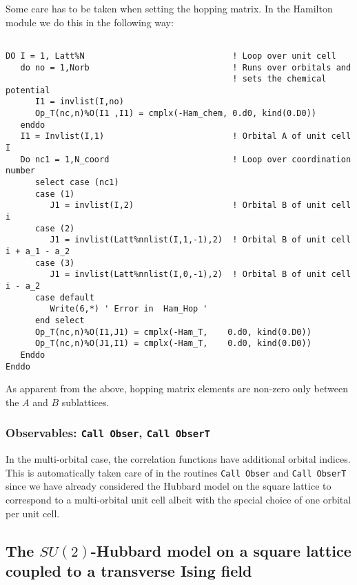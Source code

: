 Some care has to be taken when setting the hopping matrix.    In the Hamilton module    we do this in the following way:

\begin{lstlisting}

DO I = 1, Latt%N                              ! Loop over unit cell 
   do no = 1,Norb                             ! Runs over orbitals and 
                                              ! sets the chemical potential
      I1 = invlist(I,no)  
      Op_T(nc,n)%O(I1 ,I1) = cmplx(-Ham_chem, 0.d0, kind(0.D0))
   enddo
   I1 = Invlist(I,1)                          ! Orbital A of unit cell I
   Do nc1 = 1,N_coord                         ! Loop over coordination  number
      select case (nc1)
      case (1)
         J1 = invlist(I,2)                    ! Orbital B of unit cell i
      case (2)
         J1 = invlist(Latt%nnlist(I,1,-1),2)  ! Orbital B of unit cell i + a_1 - a_2
      case (3)
         J1 = invlist(Latt%nnlist(I,0,-1),2)  ! Orbital B of unit cell i - a_2 
      case default
         Write(6,*) ' Error in  Ham_Hop '  
      end select
      Op_T(nc,n)%O(I1,J1) = cmplx(-Ham_T,    0.d0, kind(0.D0))   
      Op_T(nc,n)%O(J1,I1) = cmplx(-Ham_T,    0.d0, kind(0.D0))
   Enddo
Enddo

\end{lstlisting}
As apparent from the above, hopping matrix elements   are non-zero only between the $A$ and $B$  sublattices. 

\subsubsection{Observables:  \texttt{Call Obser},   \texttt{Call ObserT}}

In the multi-orbital case,  the correlation functions have additional orbital indices. This is automatically taken care of in the routines \texttt{Call Obser} and \texttt{Call ObserT}  since  we have already considered the  Hubbard model on the square lattice to correspond to a multi-orbital unit cell albeit with the special choice of one orbital per unit cell. 

\subsection{The $SU(2)$-Hubbard model on a square lattice coupled to a transverse Ising field}\label{sec:walk2}

